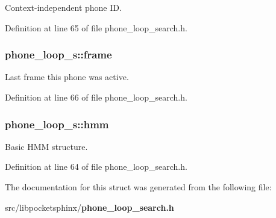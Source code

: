 \-Context-\/independent phone \-I\-D. 



\-Definition at line 65 of file phone\-\_\-loop\-\_\-search.\-h.

\subsubsection[{frame}]{ {\bf phone\-\_\-loop\-\_\-s\-::frame}}\label{structphone__loop__s_abd028e1ca731cc00d0b8bdf090289242}


\-Last frame this phone was active. 



\-Definition at line 66 of file phone\-\_\-loop\-\_\-search.\-h.

\subsubsection[{hmm}]{ {\bf phone\-\_\-loop\-\_\-s\-::hmm}}\label{structphone__loop__s_ad5812b40537df9b570dfc78f5352d112}


\-Basic \-H\-M\-M structure. 



\-Definition at line 64 of file phone\-\_\-loop\-\_\-search.\-h.



\-The documentation for this struct was generated from the following file\-:\begin{DoxyCompactItemize}
\item 
src/libpocketsphinx/{\bf phone\-\_\-loop\-\_\-search.\-h}\end{DoxyCompactItemize}
